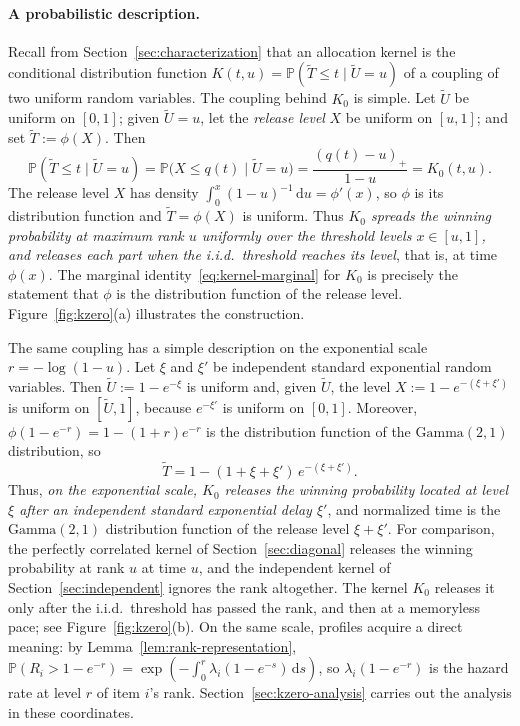 \documentclass[11pt]{article}
\theoremstyle{definition}
\theoremstyle{remark}
\newcommand{\Pp}{\mathbb P}
\newcommand{\dd}{\,\mathrm d}
\begin{document}
\paragraph{A probabilistic description.}
Recall from Section~\ref{sec:characterization} that an allocation kernel is the conditional distribution function $K(t,u)=\Pp(\widetilde T\le t\mid\widetilde U=u)$ of a coupling of two uniform random variables.
The coupling behind $K_0$ is simple.
Let $\widetilde U$ be uniform on $[0,1]$; given $\widetilde U=u$, let the \emph{release level} $X$ be uniform on $[u,1]$; and set $\widetilde T:=\phi(X)$.
Then
\[
 \Pp(\widetilde T\le t\mid\widetilde U=u)
 =\Pp\bigl(X\le q(t)\mid\widetilde U=u\bigr)
 =\frac{(q(t)-u)_+}{1-u}
 =K_0(t,u).
\]
The release level $X$ has density $\int_0^x(1-u)^{-1}\dd u=\phi'(x)$, so $\phi$ is its distribution function and $\widetilde T=\phi(X)$ is uniform.
Thus \emph{$K_0$ spreads the winning probability at maximum rank $u$ uniformly over the threshold levels $x\in[u,1]$, and releases each part when the i.i.d.\ threshold reaches its level}, that is, at time $\phi(x)$.
The marginal identity~\eqref{eq:kernel-marginal} for $K_0$ is precisely the statement that $\phi$ is the distribution function of the release level.
Figure~\ref{fig:kzero}(a) illustrates the construction.

The same coupling has a simple description on the exponential scale
$r=-\log(1-u)$.
Let $\xi$ and $\xi'$ be independent standard exponential random variables.
Then $\widetilde U:=1-e^{-\xi}$ is uniform and, given $\widetilde U$, the level $X:=1-e^{-(\xi+\xi')}$ is uniform on $[\widetilde U,1]$, because $e^{-\xi'}$ is uniform on $[0,1]$.
Moreover, $\phi(1-e^{-r})=1-(1+r)e^{-r}$ is the distribution function of the $\mathrm{Gamma}(2,1)$ distribution, so
\[
 \widetilde T=1-(1+\xi+\xi')\,e^{-(\xi+\xi')}.
\]
Thus, \emph{on the exponential scale, $K_0$ releases the winning probability located at level $\xi$ after an independent standard exponential delay $\xi'$}, and normalized time is the $\mathrm{Gamma}(2,1)$ distribution function of the release level $\xi+\xi'$.
For comparison, the perfectly correlated kernel of Section~\ref{sec:diagonal} releases the winning probability at rank $u$ at time $u$, and the independent kernel of Section~\ref{sec:independent} ignores the rank altogether.
The kernel $K_0$ releases it only after the i.i.d.\ threshold has passed the rank, and then at a memoryless pace; see Figure~\ref{fig:kzero}(b).
On the same scale, profiles acquire a direct meaning: by Lemma~\ref{lem:rank-representation}, $\Pp(R_i>1-e^{-r})=\exp(-\int_0^r\lambda_i(1-e^{-s})\dd s)$, so $\lambda_i(1-e^{-r})$ is the hazard rate at level $r$ of item $i$'s rank.
Section~\ref{sec:kzero-analysis} carries out the analysis in these coordinates.
\end{document}

